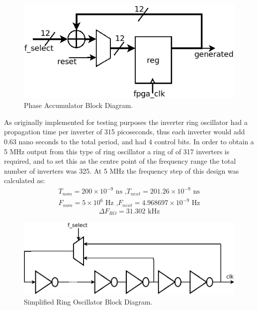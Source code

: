 \documentclass[11pt,english,british]{report}
\begin{document}
\begin{figure}[h]
	\centering
	\includegraphics[scale=0.5]{../phase_accum}
	\caption{Phase Accumulator Block Diagram.}
	\label{fig:my_pa}
\end{figure}
As originally implemented for testing purposes the inverter ring oscillator had a propagation time per inverter of 315 picoseconds, thus each inverter would add 0.63 nano seconds to the total period, and had 4 control bits. In order to obtain a 5 MHz output from this type of ring oscillator a ring of of 317 inverters is required, and to set this as the centre point of the frequency range the total number of inverters was 325. At 5 MHz the frequency step of this design was calculated as:
\begin{align*}
T_{nom} = 200\times10^{-9}\text{ ns ,}T_{next} = 201.26\times10^{-9}\text{ ns} \\
F_{nom} = 5\times10^{6}\text{ Hz ,}F_{next} = 4.968697\times10^{-9}\text{ Hz}
\end{align*} 
\begin{equation*}
\Delta F_{RO} = 31.302\text{ kHz}
\end{equation*}
\begin{figure}[h]
	\centering
	\includegraphics[scale=0.35]{../ring_osc}
	\caption{Simplified Ring Oscillator Block Diagram.}
	\label{fig:my_ring_osc}
\end{figure}
\end{document}
